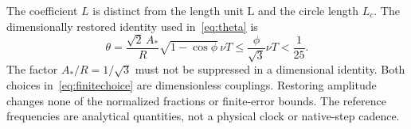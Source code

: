 The coefficient $L$ is distinct from the length unit $\mathrm L$ and the circle length $L_c$. The dimensionally restored identity used in~\eqref{eq:theta} is
\begin{equation}\label{eq:dimtheta}%
 \theta=\frac{\sqrt2\,A_*}{R}\sqrt{1-\cos\phi}\,\nu T
 \le\frac{\phi}{\sqrt3}\nu T<\frac1{25}.
\end{equation}
The factor $A_*/R=1/\sqrt3$ must not be suppressed in a dimensional identity. Both choices in~\eqref{eq:finitechoice} are dimensionless couplings. Restoring amplitude changes none of the normalized fractions or finite-error bounds. The reference frequencies are analytical quantities, not a physical clock or native-step cadence.
